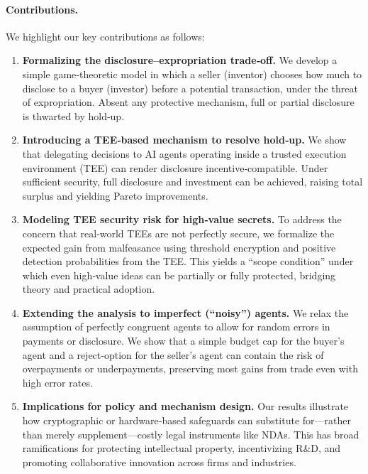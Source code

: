 \paragraph{Contributions.}
We highlight our key contributions as follows:
\begin{enumerate}[noitemsep]
\item \textbf{Formalizing the disclosure–expropriation trade‐off.} We develop a simple game‐theoretic model in which a seller (inventor) chooses how much to disclose to a buyer (investor) before a potential transaction, under the threat of expropriation. Absent any protective mechanism, full or partial disclosure is thwarted by hold‐up.

\item \textbf{Introducing a TEE‐based mechanism to resolve hold‐up.} 
We show that delegating decisions to AI agents operating inside a trusted execution environment (TEE) can render disclosure incentive‐compatible. Under sufficient security, full disclosure and investment can be achieved, raising total surplus and yielding Pareto improvements.

\item \textbf{Modeling TEE security risk for high‐value secrets.}
To address the concern that real‐world TEEs are not perfectly secure, we formalize the expected gain from malfeasance using threshold encryption and positive detection probabilities from the TEE. This yields a “scope condition” under which even high‐value ideas can be partially or fully protected, bridging theory and practical adoption.

\item \textbf{Extending the analysis to imperfect (“noisy”) agents.} 
We relax the assumption of perfectly congruent agents to allow for random errors in payments or disclosure. We show that a simple budget cap for the buyer’s agent and a reject‐option for the seller’s agent can contain the risk of overpayments or underpayments, preserving most gains from trade even with high error rates.

\item \textbf{Implications for policy and mechanism design.} 
Our results illustrate how cryptographic or hardware‐based safeguards can substitute for—rather than merely supplement—costly legal instruments like NDAs. This has broad ramifications for protecting intellectual property, incentivizing R\&D, and promoting collaborative innovation across firms and industries.
\end{enumerate}